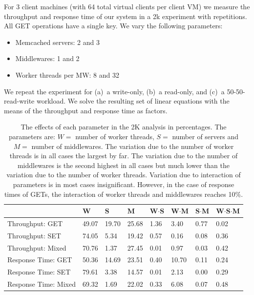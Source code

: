 \documentclass[11pt,a4paper]{article}
\begin{document}
For 3 client machines (with 64 total virtual clients per client VM) we measure the throughput and response time of our system in a 2k experiment with repetitions. All GET operations have a single key. We vary the following parameters:

\begin{itemize}
		
	\item Memcached servers: 2 and 3
	\item Middlewares: 1 and 2
	\item Worker threads per MW: 8 and 32
	      	      
\end{itemize}

We repeat the experiment for (a)~a write-only, (b)~a read-only, and (c)~a 50-50-read-write workload. We solve the resulting set of linear equations with the means of the throughput and response time as factors.


\begin{table}[h]
\centering
\caption{The effects of each parameter in the 2K analysis in percentages. The parameters are: $W=$ number of worker threads, $S=$ number of servers and $M=$ number of middlewares. The variation due to the number of worker threads is in all cases the largest by far. The variation due to the number of middlewares is the second highest in all cases but much lower than the variation due to the number of worker threads. Variation due to interaction of parameters is in most cases insignificant. However, in the case of response times of GETs, the interaction of worker threads and middlewares reaches 10\%.}
\label{table:2k}
\begin{tabular}{@{}l|lllllll@{}}
\toprule
                     & W     & S     & M     & W$\cdot$S & W$\cdot$M & S$\cdot$M & W$\cdot$S$\cdot$M \\ \midrule
Throughput: GET      & 49.07 & 19.70 & 25.68 & 1.36      & 3.40      & 0.77      & 0.02              \\
Throughput: SET      & 74.05 & 5.34  & 19.42 & 0.57      & 0.16      & 0.08      & 0.36              \\
Throughput: Mixed    & 70.76 & 1.37  & 27.45 & 0.01      & 0.97      & 0.03      & 0.42              \\ \midrule
Response Time: GET   & 50.36 & 14.69 & 23.51 & 0.40      & 10.70     & 0.11      & 0.24              \\
Response Time: SET   & 79.61 & 3.38  & 14.57 & 0.01      & 2.13      & 0.00      & 0.29              \\
Response Time: Mixed & 69.32 & 1.69  & 22.02 & 0.33      & 6.08      & 0.07      & 0.48              \\ \bottomrule
\end{tabular}
\end{table}
\end{document}
